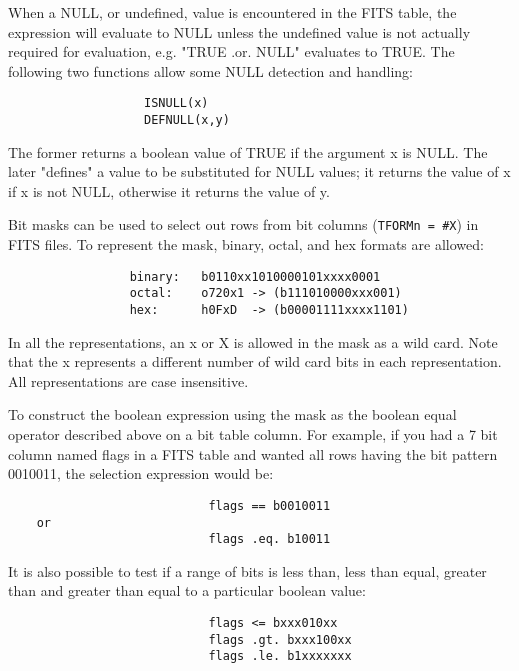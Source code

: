 \documentclass[11pt]{article}
\begin{document}
When  a  NULL, or undefined, value is encountered in the FITS table,
the expression will evaluate to NULL unless the undefined  value  is
not   actually   required  for  evaluation,  e.g. "TRUE  .or.  NULL"
evaluates to TRUE. The  following  two  functions  allow  some  NULL
detection  and  handling:  

\begin{verbatim}
                   ISNULL(x)
                   DEFNULL(x,y)
\end{verbatim}

The former returns a boolean value of TRUE if the  argument  x  is
NULL.   The later  "defines"  a  value  to  be  substituted  for NULL
values; it returns the value of x if x is not NULL, otherwise  it
returns  the value of y.

Bit  masks can be used to select out rows from bit columns ({\tt TFORMn =
\#X}) in FITS files. To represent the mask,  binary,  octal,  and  hex
formats are allowed:
 
\begin{verbatim}
                 binary:   b0110xx1010000101xxxx0001
                 octal:    o720x1 -> (b111010000xxx001)
                 hex:      h0FxD  -> (b00001111xxxx1101)
\end{verbatim}

In  all  the  representations, an x or X is allowed in the mask as a
wild card. Note that the x represents a  different  number  of  wild
card  bits  in  each  representation.  All  representations are case
insensitive.

To construct the boolean expression using the mask  as  the  boolean
equal  operator  described above on a bit table column. For example,
if you had a 7 bit column named flags in a  FITS  table  and  wanted
all  rows  having  the bit pattern 0010011, the selection expression
would be:

 
\begin{verbatim}
                            flags == b0010011
    or
                            flags .eq. b10011
\end{verbatim}

It is also possible to test if a range of bits is  less  than,  less
than  equal,  greater  than  and  greater than equal to a particular
boolean value:

 
\begin{verbatim}
                            flags <= bxxx010xx
                            flags .gt. bxxx100xx
                            flags .le. b1xxxxxxx
\end{verbatim}
\end{document}

